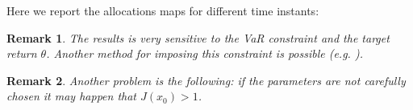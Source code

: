 \documentclass[]{article}
\newtheorem{remark}{Remark}
\begin{document}
Here we report the allocations maps for different time instants:
\begin{remark}
	The results is very sensitive to the VaR constraint and the target return $\theta$. Another method for imposing this constraint is possible (e.g. \cite{Lue13}). 
\end{remark}
\begin{remark}
	Another problem is the following: if the parameters are not carefully chosen it may happen that $J(x_0) > 1 $.
\end{remark}
\begin{figure}[H]
	\\

\end{figure}
\end{document}
